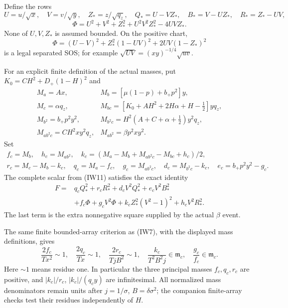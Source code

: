 Define the rows
\[
 U=u/\sqrt x,\quad V=v/\sqrt y,\quad Z_*=z/\sqrt{q_z},
 \quad Q_*=U-VZ_*,\quad B_*=V-UZ_*,\quad R_*=Z_*-UV,
\]
\[
 \Phi=U^2+V^2+Z_*^2+U^2V^2Z_*^2-4UVZ_*.
\]
None of $U,V,Z_*$ is assumed bounded. On the positive chart,
\[
 \Phi=(U-V)^2+Z_*^2(1-UV)^2+2UV(1-Z_*)^2             \tag{IW14}
\]
is a legal separated SOS; for example
$\sqrt{UV}=(xy)^{-1/4}\sqrt{uv}$.

For an explicit finite definition of the actual masses, put
$K_0=CH^2+D_+(1-H)^2$ and
\[
\begin{array}{ll}
 M_a=Ax,&M_b=[\mu(1-p)+b_+p^2]y,\\
 M_c=\alpha q_z,&
 M_{bc}=[K_0+AH^2+2H\alpha+H-\tfrac12]yq_z,\\
 M_{b^2}=b_+p^2y^2,&
 M_{b^2c}=H^2(A+C+\alpha+\tfrac12)y^2q_z,\\
 M_{ab^2c}=CH^2xy^2q_z,&M_{ab^2}=\beta p^2xy^2.
\end{array}
\]
Set
\[
\begin{gathered}
 f_c=M_b,\quad h_c=M_{ab^2},\quad
 k_c=(M_a-M_b+M_{ab^2c}-M_{bc}+h_c)/2,\\
 r_c=M_c-M_b-k_c,\quad q_c=M_a-f_c,\quad
 g_c=M_{ab^2c},\quad d_c=M_{b^2c}-k_c,
 \quad e_c=b_+p^2y^2-g_c.
\end{gathered}
\]
The complete scalar from (IW11) satisfies the exact identity
\[
\begin{split}
 F={}&q_cQ_*^2+r_cR_*^2+d_cV^2Q_*^2+e_cV^2B_*^2\\
 &+f_c\Phi+g_cV^2\Phi+k_cZ_*^2(V^2-1)^2+h_cV^2R_*^2.
\end{split}                                                     \tag{IW15}
\]
The last term is the extra nonnegative square supplied by the actual
$\beta$ event. 

The same finite bounded-array criterion as (IW7), with the displayed
mass definitions, gives
\[
 \frac{2f_c}{Tx^2}\sim1,\quad
 \frac{2q_c}{Tx}\sim1,\quad
 \frac{2r_c}{TjB^2}\sim1,\quad
 \frac{k_c}{T^2B^2j}\in\mathfrak m_c,\quad
 \frac{g_c}{f_c}\in\mathfrak m_c.                     \tag{IW16}
\]
Here $\sim1$ means residue one. In particular the three principal
masses $f_c,q_c,r_c$ are positive, and
$|k_c|/r_c$, $|k_c|/(q_cy)$ are infinitesimal.
All normalized mass denominators remain units after
$j=1/\sigma$, $B=\delta\sigma^2$; the companion finite-array
checks test their residues independently of $H$.

